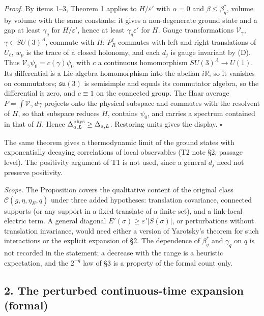 \documentclass[11pt,a4paper]{article}
\begin{document}
\emph{Proof.} By items 1--3, Theorem 1 applies to \(H/\varepsilon'\)
with \(\alpha=0\) and \(\beta\le\beta^*_q\), volume by volume with the
same constants: it gives a non-degenerate ground state and a gap at
least \(\gamma_q\) for \(H/\varepsilon'\), hence at least
\(\gamma_q\varepsilon'\) for \(H\). Gauge transformations
\(\mathcal V_\gamma\), \(\gamma\in SU(3)^\Lambda\), commute with \(H\):
\(P_R^\ell\) commutes with left and right translations of \(U_\ell\),
\(w_p\) is the trace of a closed holonomy, and each \(d_j\) is gauge
invariant by (D). Thus \(\mathcal V_\gamma\psi_0=c(\gamma)\psi_0\) with
\(c\) a continuous homomorphism \(SU(3)^\Lambda\to U(1)\). Its
differential is a Lie-algebra homomorphism into the abelian
\(i\mathbb R\), so it vanishes on commutators; \(\mathfrak{su}(3)\) is
semisimple and equals its commutator algebra, so the differential is
zero, and \(c\equiv1\) on the connected group. The Haar average
\(P=\int\mathcal V_\gamma\,d\gamma\) projects onto the physical subspace
and commutes with the resolvent of \(H\), so that subspace reduces
\(H\), contains \(\psi_0\), and carries a spectrum contained in that of
\(H\). Hence \(\Delta^{\rm phys}_{a,L}\ge\Delta_{a,L}\). Restoring units
gives the display. \(\square\)

The same theorem gives a thermodynamic limit of the ground states with
exponentially decaying correlations of local observables (T2 note §2,
passage level). The positivity argument of T1 is not used, since a
general \(d_j\) need not preserve positivity.

\emph{Scope.} The Proposition covers the qualitative content of the
original class \(\mathcal C(g,\eta,\eta_E,q)\) under three added
hypotheses: translation covariance, connected supports (or any support
in a fixed translate of a finite set), and a link-local electric term. A
general diagonal \(E'(\sigma)\ge\varepsilon'|S(\sigma)|\), or
perturbations without translation invariance, would need either a
version of Yarotsky's theorem for such interactions or the explicit
expansion of §2. The dependence of \(\beta^*_q\) and \(\gamma_q\) on
\(q\) is not recorded in the statement; a decrease with the range is a
heuristic expectation, and the \(2^{-q}\) law of §3 is a property of the
formal count only.

\hypertarget{the-perturbed-continuous-time-expansion-formal}{%
\subsection{2. The perturbed continuous-time expansion
(formal)}\label{the-perturbed-continuous-time-expansion-formal}}
\end{document}
